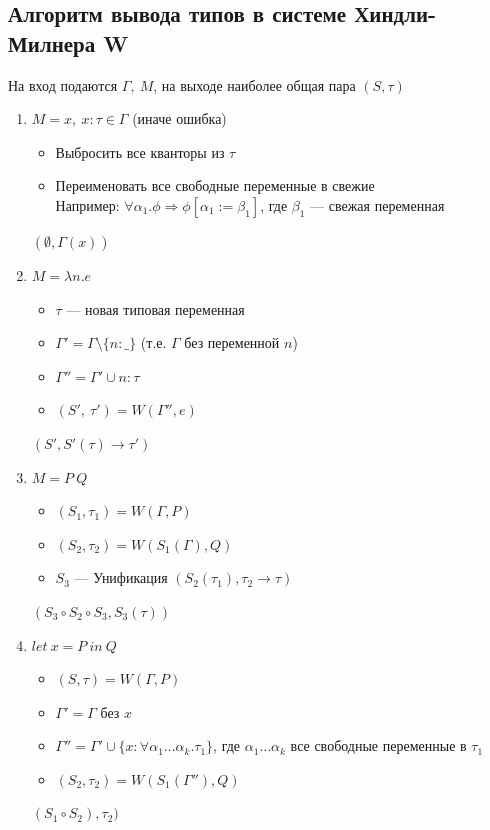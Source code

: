 \documentclass[12pt]{article}
\begin{document}
\subsection{Алгоритм вывода типов в системе Хиндли-Милнера W}
На вход подаются $\Gamma,\ M$, на выходе наиболее общая пара $(S, \tau)$
\begin{enumerate}
    \item $M = x ,\ x:\tau  \in \Gamma$ (иначе ошибка)
    \begin{itemize}
        \item Выбросить все кванторы из $\tau$
        \item Переименовать все свободные переменные в свежие \\
        Например: $\forall \alpha_1.\phi \Rightarrow \phi[\alpha_1 := \beta_1]$, где $\beta_1$ --- свежая переменная
    \end{itemize}
    $(\emptyset, \Gamma(x))$
    \item $M = \lambda n.e$
    \begin{itemize}
        \item $\tau$ --- новая типовая переменная
        \item $\Gamma' = \Gamma \setminus \{n : \_ \}$ (т.е. $\Gamma$ без переменной $n$)
        \item $\Gamma'' = \Gamma' \cup {n : \tau}$
        \item $(S',\ \tau') = W(\Gamma'', e)$
    \end{itemize}
    $(S', S'(\tau) \rightarrow \tau')$
    \item $M = P\ Q$
    \begin{itemize}
        \item $(S_1, \tau_1) = W(\Gamma, P)$
        \item $(S_2, \tau_2) = W(S_1(\Gamma), Q)$
        \item $S_3$ --- Унификация $(S_2(\tau_1), \tau_2 \rightarrow \tau)$
    \end{itemize}
    $(S_3 \circ S_2 \circ S_3, S_3(\tau))$
    \item $let\ x = P\ in\ Q$
    \begin{itemize}
        \item $(S, \tau) = W(\Gamma, P)$
        \item $\Gamma' = \Gamma$ без $x$
        \item $\Gamma'' = \Gamma' \cup \{ x : \forall \alpha_1 \dots \alpha_k. \tau_1 \}$, где $\alpha_1 \dots \alpha_k$ все свободные переменные в $\tau_1$
        \item $(S_2, \tau_2) = W(S_1(\Gamma''), Q)$
    \end{itemize}
    $(S_1 \circ S_2), \tau_2)$
\end{enumerate}
\end{document}
